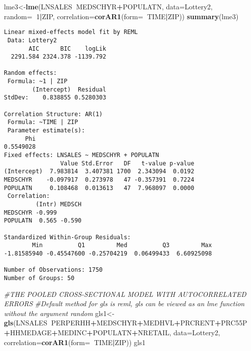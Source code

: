 \documentclass[]{book}
\newenvironment{Shaded}{\begin{snugshade}}{\end{snugshade}}
\newcommand{\CommentTok}[1]{\textcolor[rgb]{0.56,0.35,0.01}{\textit{#1}}}
\newcommand{\DataTypeTok}[1]{\textcolor[rgb]{0.13,0.29,0.53}{#1}}
\newcommand{\DecValTok}[1]{\textcolor[rgb]{0.00,0.00,0.81}{#1}}
\newcommand{\KeywordTok}[1]{\textcolor[rgb]{0.13,0.29,0.53}{\textbf{#1}}}
\newcommand{\NormalTok}[1]{#1}
\newcommand{\OperatorTok}[1]{\textcolor[rgb]{0.81,0.36,0.00}{\textbf{#1}}}
\begin{document}
\begin{Shaded}
\begin{Highlighting}[]
\NormalTok{lme3<-}\KeywordTok{lme}\NormalTok{(LNSALES}\OperatorTok{~}\NormalTok{MEDSCHYR}\OperatorTok{+}\NormalTok{POPULATN, }\DataTypeTok{data=}\NormalTok{Lottery2, }\DataTypeTok{random=}\OperatorTok{~}\DecValTok{1}\OperatorTok{|}\NormalTok{ZIP, }\DataTypeTok{correlation=}\KeywordTok{corAR1}\NormalTok{(}\DataTypeTok{form=}\OperatorTok{~}\NormalTok{TIME}\OperatorTok{|}\NormalTok{ZIP))}
\KeywordTok{summary}\NormalTok{(lme3)}
\end{Highlighting}
\end{Shaded}

\begin{verbatim}
Linear mixed-effects model fit by REML
 Data: Lottery2 
       AIC      BIC    logLik
  2291.584 2324.378 -1139.792

Random effects:
 Formula: ~1 | ZIP
        (Intercept)  Residual
StdDev:    0.838855 0.5280303

Correlation Structure: AR(1)
 Formula: ~TIME | ZIP 
 Parameter estimate(s):
      Phi 
0.5549028 
Fixed effects: LNSALES ~ MEDSCHYR + POPULATN 
                Value Std.Error   DF   t-value p-value
(Intercept)  7.983814  3.407381 1700  2.343094  0.0192
MEDSCHYR    -0.097917  0.273978   47 -0.357391  0.7224
POPULATN     0.108468  0.013613   47  7.968097  0.0000
 Correlation: 
         (Intr) MEDSCH
MEDSCHYR -0.999       
POPULATN  0.565 -0.590

Standardized Within-Group Residuals:
        Min          Q1         Med          Q3         Max 
-1.81585940 -0.45547600 -0.25704219  0.06499433  6.60925098 

Number of Observations: 1750
Number of Groups: 50 
\end{verbatim}

\begin{Shaded}
\begin{Highlighting}[]
\CommentTok{#THE POOLED CROSS-SECTIONAL MODEL WITH AUTOCORRELATED ERRORS}
\CommentTok{#Default method for gls is reml, gls can be viewed as an lme function without the argument random}
\NormalTok{gls1<-}\KeywordTok{gls}\NormalTok{(LNSALES}\OperatorTok{~}\NormalTok{PERPERHH}\OperatorTok{+}\NormalTok{MEDSCHYR}\OperatorTok{+}\NormalTok{MEDHVL}\OperatorTok{+}\NormalTok{PRCRENT}\OperatorTok{+}\NormalTok{PRC55P}\OperatorTok{+}\NormalTok{HHMEDAGE}\OperatorTok{+}\NormalTok{MEDINC}\OperatorTok{+}\NormalTok{POPULATN}\OperatorTok{+}\NormalTok{NRETAIL, }\DataTypeTok{data=}\NormalTok{Lottery2, }\DataTypeTok{correlation=}\KeywordTok{corAR1}\NormalTok{(}\DataTypeTok{form=}\OperatorTok{~}\NormalTok{TIME}\OperatorTok{|}\NormalTok{ZIP)) }
\NormalTok{gls1}
\end{Highlighting}
\end{Shaded}
\end{document}
